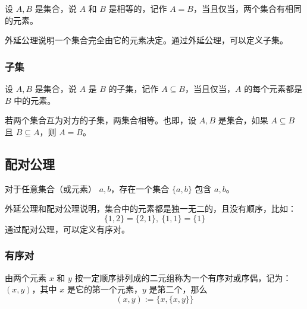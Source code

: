 \begin{axiom}
    设 $A,B$ 是集合，说 $A$ 和 $B$ 是相等的，记作 $A = B$，当且仅当，两个集合有相同的元素。
\end{axiom}

\begin{note}
    外延公理说明一个集合完全由它的元素决定。通过外延公理，可以定义子集。
\end{note}
\vspace{1em}

\subsubsection{子集}
\begin{definition}[子集 Subset]
    设 $ A,B $ 是集合，说 $ A $ 是 $ B $ 的子集，记作 $ A\subseteq B $，当且仅当，$ A $ 的每个元素都是 $ B $ 中的元素。
\end{definition}

\begin{theorem}
    若两个集合互为对方的子集，两集合相等。也即，设 $ A,B $ 是集合，如果 $ A\subseteq B $ 且 $ B\subseteq A $，则 $ A = B $。
\end{theorem}

\subsection{配对公理}

\begin{axiom}
    对于任意集合（或元素） $a,b$，存在一个集合 $\{a,b\}$ 包含 $a,b$。
\end{axiom}

\begin{note}
    外延公理和配对公理说明，集合中的元素都是独一无二的，且没有顺序，比如：
    \[  
        \{1,2\} = \{2,1\} ,\  \{1,1\} = \{1\} 
    \]
    通过配对公理，可以定义有序对。
\end{note}

\subsubsection{有序对}
\begin{definition}
    由两个元素 $ x $ 和 $ y $ 按一定顺序排列成的二元组称为一个有序对或序偶，记为：$ (x,y) $，其中 $ x $ 是它的第一个元素，$ y $ 是第二个，那么
    \[
        (x,y) := \{x,\{x,y\}\}
    \]
\end{definition}
\vspace{1em}

